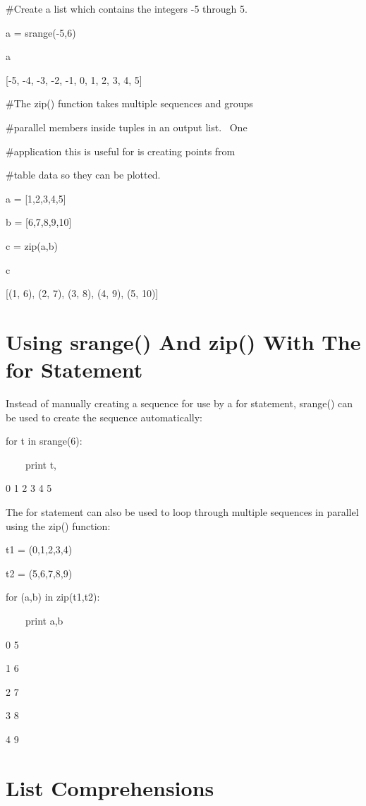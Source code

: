 \documentclass[12pt,twoside]{book}
\begin{document}
\#Create a list which contains the integers {}-5 through 5.

a = srange({}-5,6)

a

{\textbar}

[{}-5, {}-4, {}-3, {}-2, {}-1, 0, 1, 2, 3, 4, 5]

\#The zip() function takes multiple sequences and groups

\#parallel members inside tuples in an output list. \ One

\#application this is useful for is creating points from

\#table data so they can be plotted.

a = [1,2,3,4,5]

b = [6,7,8,9,10]

c = zip(a,b)

c

{\textbar}

[(1, 6), (2, 7), (3, 8), (4, 9), (5, 10)]

\section[Using srange() And zip() With The for Statement]{ Using srange() And zip() With The for Statement}

Instead of manually creating a sequence for use by a for statement, srange() can be used to create the sequence automatically:


\bigskip

for t in srange(6):

\ \ \ \ print t,

{\textbar}

0 1 2 3 4 5


\bigskip

The for statement can also be used to loop through multiple sequences in parallel using the zip() function: 

\bigskip

t1 = (0,1,2,3,4)

t2 = (5,6,7,8,9)

for (a,b) in zip(t1,t2):

\ \ \ \ print a,b

{\textbar}

0 5

1 6

2 7

3 8

4 9

\section[List Comprehensions]{List Comprehensions}
\end{document}
